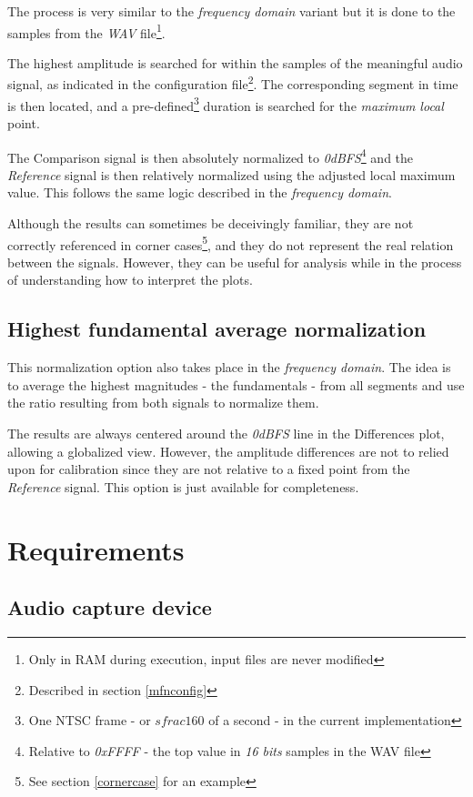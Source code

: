 \documentclass[10pt,a4paper]{report}
\begin{document}
\begin{appendices}
The process is very similar to the \textit{frequency domain} variant but it is done to the samples from the  \textit{WAV} file\footnote{Only in RAM during execution, input files are never modified}.

The highest amplitude is searched for within the samples of the meaningful audio signal, as indicated in the configuration file\footnote{Described in section \ref{mfnconfig}}. The corresponding segment in time is then located, and a pre-defined\footnote{One NTSC frame - or $sfrac{1}{60}$ of a second - in the current implementation} duration is searched for the \textit{maximum local} point.

The Comparison signal is then absolutely normalized to \textit{0dBFS}\footnote{Relative to \textit{0xFFFF} - the top value in \textit{16 bits} samples in the WAV file} and the \textit{Reference} signal is then relatively normalized using the adjusted local maximum value. This follows the same logic described in the \textit{frequency domain}.

Although the results can sometimes be deceivingly familiar, they are not correctly referenced in corner cases\footnote{See section \ref{cornercase} for an example}, and they do not represent the real relation between the signals. However, they can be useful for analysis while in the process of understanding how to interpret the plots.

\section{Highest fundamental average normalization}

This normalization option also takes place in the \textit{frequency domain}. The idea is to average the highest magnitudes - the fundamentals - from all segments and use the ratio resulting from both signals to normalize them.

The results are always centered around the \textit{0dBFS} line in the Differences plot, allowing a globalized view. However, the amplitude differences are not to relied upon for calibration since they are not relative to a fixed point from the \textit{Reference} signal. This option is just available for completeness.

\chapter{Requirements}
\label{requirements}
\section{Audio capture device}


\end{appendices}
\end{document}
